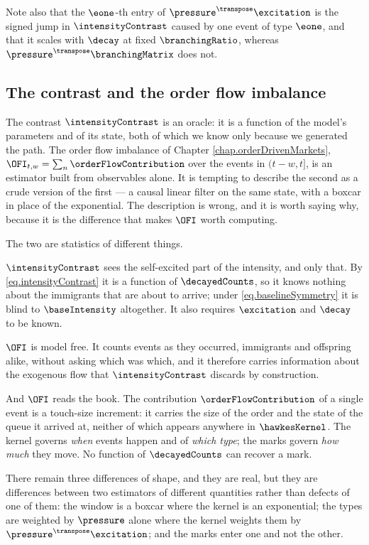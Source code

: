 Note also that the $\eone$-th entry of $\pressure^{\transpose}\excitation$
is the signed jump in $\intensityContrast$ caused by one event of type $\eone$,
and that it scales with $\decay$ at fixed $\branchingRatio$,
whereas $\pressure^{\transpose}\branchingMatrix$ does not.

\subsection{The contrast and the order flow imbalance}

The contrast $\intensityContrast$ is an oracle: it is a function of the model's parameters and
of its state, both of which we know only because we generated the path.
The order flow imbalance of Chapter \ref{chap.orderDrivenMarkets},
$\OFI_{t,w} = \sum_n \orderFlowContribution$ over the events in $(t-w, t]$,
is an estimator built from observables alone.
It is tempting to describe the second as a crude version of the first --- a causal linear
filter on the same state, with a boxcar in place of the exponential.
The description is wrong, and it is worth saying why, because it is the difference that makes
$\OFI$ worth computing.

The two are statistics of different things.

$\intensityContrast$ sees the self-excited part of the intensity, and only that.
By \eqref{eq.intensityContrast} it is a function of $\decayedCounts$,
so it knows nothing about the immigrants that are about to arrive;
under \eqref{eq.baselineSymmetry} it is blind to $\baseIntensity$ altogether.
It also requires $\excitation$ and $\decay$ to be known.

$\OFI$ is model free.
It counts events as they occurred, immigrants and offspring alike,
without asking which was which,
and it therefore carries information about the exogenous flow that $\intensityContrast$
discards by construction.

And $\OFI$ reads the book.
The contribution $\orderFlowContribution$ of a single event is a touch-size increment:
it carries the size of the order and the state of the queue it arrived at,
neither of which appears anywhere in $\hawkesKernel$.
The kernel governs \emph{when} events happen and of \emph{which type};
the marks govern \emph{how much} they move.
No function of $\decayedCounts$ can recover a mark.

There remain three differences of shape, and they are real, but they are differences between
two estimators of different quantities rather than defects of one of them:
the window is a boxcar where the kernel is an exponential;
the types are weighted by $\pressure$ alone where the kernel weights them by
$\pressure^{\transpose}\excitation$;
and the marks enter one and not the other.

